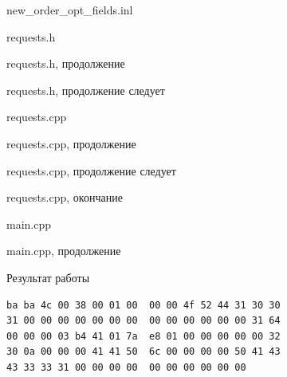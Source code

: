 \documentclass[unknownkeysallowed,xcolor=table]{beamer}
\makeatletter
\newcommand{\srcmediumsize}{\@setfontsize{\srcmediumsize}{7pt}{7pt}}
\newcommand{\srcsize}{\@setfontsize{\srcsize}{6pt}{6pt}}
\makeatother
\begin{document}
\begin{frame}[fragile]{new\_order\_opt\_fields.inl}

\end{frame}

\begin{frame}[fragile]{requests.h}

\end{frame}

\begin{frame}[fragile]{requests.h, продолжение}

\end{frame}

\begin{frame}[fragile]{requests.h, продолжение следует}

\end{frame}

\begin{frame}[fragile]{requests.cpp}

\end{frame}

\begin{frame}[fragile]{requests.cpp, продолжение}

\end{frame}

\begin{frame}[fragile]{requests.cpp, продолжение следует}

\end{frame}

\begin{frame}[fragile]{requests.cpp, окончание}

\end{frame}

\begin{frame}[fragile]{main.cpp}

\end{frame}

\begin{frame}[fragile]{main.cpp, продолжение}

\end{frame}

\begin{frame}[fragile]{Результат работы}

\begin{lstlisting}
ba ba 4c 00 38 00 01 00  00 00 4f 52 44 31 30 30
31 00 00 00 00 00 00 00  00 00 00 00 00 00 31 64
00 00 00 03 b4 41 01 7a  e8 01 00 00 00 00 00 32
30 0a 00 00 00 41 41 50  6c 00 00 00 00 50 41 43
43 33 33 31 00 00 00 00  00 00 00 00 00 00
\end{lstlisting}

\end{frame}
\end{document}

